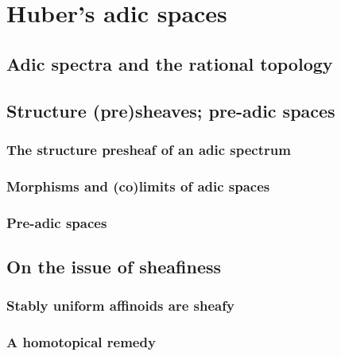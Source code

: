 \section{Huber's adic spaces}
    \subsection{Adic spectra and the rational topology}
    
    \subsection{Structure (pre)sheaves; pre-adic spaces}
        \subsubsection{The structure presheaf of an adic spectrum}
        
        \subsubsection{Morphisms and (co)limits of adic spaces}
        
        \subsubsection{Pre-adic spaces}
    
    \subsection{On the issue of sheafiness}
        \subsubsection{Stably uniform affinoids are sheafy}
        
        \subsubsection{A homotopical remedy}